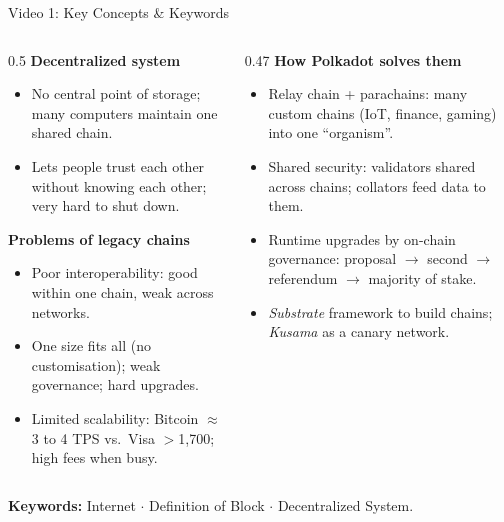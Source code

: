 \documentclass[aspectratio=169,11pt]{beamer}
\begin{document}
\begin{frame}{Video 1: Key Concepts \& Keywords}
  \scriptsize
  \begin{columns}[T,onlytextwidth]
    \begin{column}{0.5\textwidth}
      \textbf{Decentralized system}
      \begin{itemize}
        \item No central point of storage; many computers maintain one shared chain.
        \item Lets people trust each other without knowing each other; very hard to shut down.
      \end{itemize}
      \textbf{Problems of legacy chains}
      \begin{itemize}
        \item Poor interoperability: good within one chain, weak across networks.
        \item One size fits all (no customisation); weak governance; hard upgrades.
        \item Limited scalability: Bitcoin $\approx$3 to 4 TPS vs.\ Visa $>$1{,}700; high fees when busy.
      \end{itemize}
    \end{column}
    \begin{column}{0.47\textwidth}
      \textbf{How Polkadot solves them}
      \begin{itemize}
        \item \alert{Relay chain + parachains}: many custom chains (IoT, finance, gaming) into one ``organism''.
        \item \alert{Shared security}: validators shared across chains; collators feed data to them.
        \item Runtime upgrades by on-chain governance: proposal $\rightarrow$ second $\rightarrow$ referendum $\rightarrow$ majority of stake.
        \item \emph{Substrate} framework to build chains; \emph{Kusama} as a canary network.
      \end{itemize}
    \end{column}
  \end{columns}
  \vfill
  \textbf{Keywords:} \alert{Internet} \;$\cdot$\; \alert{Definition of Block} \;$\cdot$\; \alert{Decentralized System}.
\end{frame}
\end{document}
